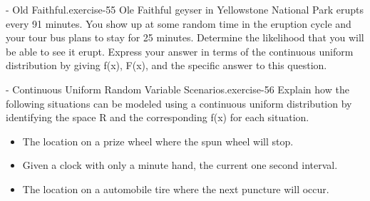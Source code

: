 \documentclass[10pt,]{book}
\numberwithin{equation}{section}
\begin{document}
%
\par
\hypertarget{p-830}{}%
\begin{inlineexercise}{- Old Faithful.}{exercise-55}%
\hypertarget{p-831}{}%
Ole Faithful geyser in Yellowstone National Park erupts every 91 minutes. You show up at some random time in the eruption cycle and your tour bus plans to stay for 25 minutes. Determine the likelihood that you will be able to see it erupt.  Express your answer in terms of the continuous uniform distribution by giving f(x), F(x), and the specific answer to this question.%
\end{inlineexercise}
%
\par
\hypertarget{p-832}{}%
\begin{inlineexercise}{- Continuous Uniform Random Variable Scenarios.}{exercise-56}%
\hypertarget{p-833}{}%
Explain how the following situations can be modeled using a continuous uniform distribution by identifying the space R and the corresponding f(x) for each situation. \leavevmode%
\begin{itemize}[label=\textbullet]
\item{}The location on a prize wheel where the spun wheel will stop.%
\item{}Given a clock with only a minute hand, the current one second interval.%
\item{}The location on a automobile tire where the next puncture will occur.%
\end{itemize}
%
\end{inlineexercise}
%
\par
\hypertarget{p-834}{}%
\end{document}
